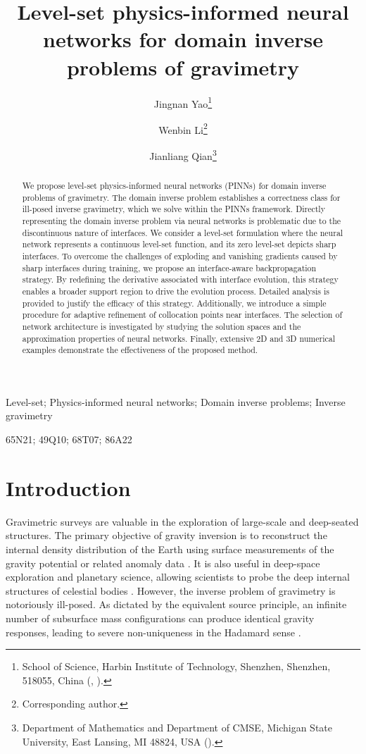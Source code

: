 \documentclass[final,hidelinks,onefignum,onetabnum]{siamart251216}
\title{Level-set physics-informed neural networks for domain inverse problems of gravimetry}
\author{
  Jingnan Yao\thanks{
                   School of Science, Harbin Institute of Technology, Shenzhen,
                   Shenzhen, 518055, China
                   (\email{24B958002@stu.hit.edu.cn}, \email{liwenbin@hit.edu.cn}).}
  \and
  Wenbin Li\footnotemark[1] \thanks{Corresponding author.}
  \and
  Jianliang Qian\thanks{Department of Mathematics and Department of CMSE,
                       Michigan State University, East Lansing, MI 48824, USA
                       (\email{jqian@msu.edu}).}
}
\begin{document}
\maketitle

\begin{abstract}
We propose level-set physics-informed neural networks (PINNs) for domain inverse problems of gravimetry. The domain inverse problem establishes a correctness class for ill-posed inverse gravimetry, which we solve within the PINNs framework. Directly representing the domain inverse problem via neural networks is problematic due to the discontinuous nature of interfaces. We consider a level-set formulation where the neural network represents a continuous level-set function, and its zero level-set depicts sharp interfaces. To overcome the challenges of exploding and vanishing gradients caused by sharp interfaces during training, we propose an interface-aware backpropagation strategy. By redefining the derivative associated with interface evolution, this strategy enables a broader support region to drive the evolution process. Detailed analysis is provided to justify the efficacy of this strategy. Additionally, we introduce a simple procedure for adaptive refinement of collocation points near interfaces. The selection of network architecture is investigated by studying the solution spaces and the approximation properties of neural networks. Finally, extensive 2D and 3D numerical examples demonstrate the effectiveness of the proposed method.
\end{abstract}

\begin{keywords}
Level-set; Physics-informed neural networks; Domain inverse problems; Inverse gravimetry
\end{keywords}

\begin{MSCcodes}
65N21; 49Q10; 68T07; 86A22
\end{MSCcodes}

\section{Introduction}
Gravimetric surveys are valuable in the exploration of large-scale and deep-seated structures. The primary objective of gravity inversion is to reconstruct the internal density distribution of the Earth using surface measurements of the gravity potential or related anomaly data \cite{zhd15}. It is also useful in deep-space exploration and planetary science, allowing scientists to probe the deep internal structures of celestial bodies \cite{wiephi98,zuberetc13}.
However, the inverse problem of gravimetry is notoriously ill-posed. As dictated by the equivalent source principle, an infinite number of subsurface mass configurations can produce identical gravity responses, leading to severe non-uniqueness in the Hadamard sense \cite{isa90}.
\end{document}
